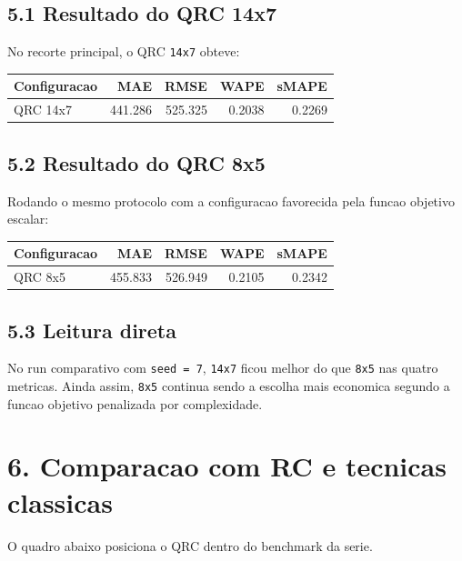 \documentclass[12pt]{article}
\begin{document}
\subsection{5.1 Resultado do QRC 14x7}\label{51-resultado-do-qrc-14x7}

No recorte principal, o QRC \texttt{14x7} obteve:

\begin{longtable}[]{@{}lrrrr@{}}
\toprule\noalign{}
Configuracao & MAE & RMSE & WAPE & sMAPE \\
\midrule\noalign{}
\endhead
\bottomrule\noalign{}
\endlastfoot
QRC 14x7 & 441.286 & 525.325 & 0.2038 & 0.2269 \\
\end{longtable}

\subsection{5.2 Resultado do QRC 8x5}\label{52-resultado-do-qrc-8x5}

Rodando o mesmo protocolo com a configuracao favorecida pela funcao objetivo escalar:

\begin{longtable}[]{@{}lrrrr@{}}
\toprule\noalign{}
Configuracao & MAE & RMSE & WAPE & sMAPE \\
\midrule\noalign{}
\endhead
\bottomrule\noalign{}
\endlastfoot
QRC 8x5 & 455.833 & 526.949 & 0.2105 & 0.2342 \\
\end{longtable}

\subsection{5.3 Leitura direta}\label{53-leitura-direta}

No run comparativo com \texttt{seed\ =\ 7}, \texttt{14x7} ficou melhor do que \texttt{8x5} nas quatro metricas. Ainda assim, \texttt{8x5} continua sendo a escolha mais economica segundo a funcao objetivo penalizada por complexidade.

\section{6. Comparacao com RC e tecnicas classicas}\label{6-comparacao-com-rc-e-tecnicas-classicas}

O quadro abaixo posiciona o QRC dentro do benchmark da serie.
\end{document}
